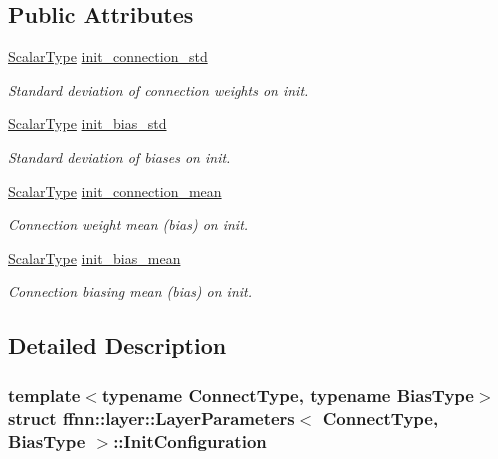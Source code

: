 \subsection*{Public Attributes}
\begin{DoxyCompactItemize}
\item 
\hyperlink{classffnn_1_1layer_1_1_layer_parameters_a3dd1354de05cbf7c05d82a8ed653714e}{Scalar\-Type} \hyperlink{structffnn_1_1layer_1_1_layer_parameters_1_1_init_configuration_ad8f3d53cb4491d2db5378d929bddfcb6}{init\-\_\-connection\-\_\-std}
\begin{DoxyCompactList}\small\item\em Standard deviation of connection weights on init. \end{DoxyCompactList}\item 
\hyperlink{classffnn_1_1layer_1_1_layer_parameters_a3dd1354de05cbf7c05d82a8ed653714e}{Scalar\-Type} \hyperlink{structffnn_1_1layer_1_1_layer_parameters_1_1_init_configuration_a1b25823d71be5fe04f8fb392fc287c3f}{init\-\_\-bias\-\_\-std}
\begin{DoxyCompactList}\small\item\em Standard deviation of biases on init. \end{DoxyCompactList}\item 
\hyperlink{classffnn_1_1layer_1_1_layer_parameters_a3dd1354de05cbf7c05d82a8ed653714e}{Scalar\-Type} \hyperlink{structffnn_1_1layer_1_1_layer_parameters_1_1_init_configuration_ab89ad5ae8ddd69c7eb55e14ca6c59186}{init\-\_\-connection\-\_\-mean}
\begin{DoxyCompactList}\small\item\em Connection weight mean (bias) on init. \end{DoxyCompactList}\item 
\hyperlink{classffnn_1_1layer_1_1_layer_parameters_a3dd1354de05cbf7c05d82a8ed653714e}{Scalar\-Type} \hyperlink{structffnn_1_1layer_1_1_layer_parameters_1_1_init_configuration_aed70a26d27b82dabc6bd427e2e3cbc40}{init\-\_\-bias\-\_\-mean}
\begin{DoxyCompactList}\small\item\em Connection biasing mean (bias) on init. \end{DoxyCompactList}\end{DoxyCompactItemize}


\subsection{Detailed Description}
\subsubsection*{template$<$typename Connect\-Type, typename Bias\-Type$>$struct ffnn\-::layer\-::\-Layer\-Parameters$<$ Connect\-Type, Bias\-Type $>$\-::\-Init\-Configuration}


